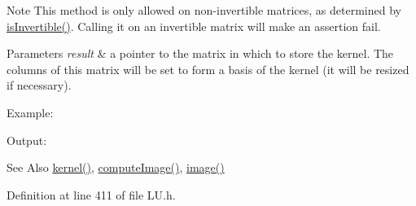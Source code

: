 \begin{DoxyNote}{Note}
This method is only allowed on non-\/invertible matrices, as determined by \hyperlink{class_l_u_a7b4fe58c504fb3c28d29f198a10bf5e0}{is\-Invertible()}. Calling it on an invertible matrix will make an assertion fail.
\end{DoxyNote}

\begin{DoxyParams}{Parameters}
{\em result} & a pointer to the matrix in which to store the kernel. The columns of this matrix will be set to form a basis of the kernel (it will be resized if necessary).\\
\hline
\end{DoxyParams}
Example\-:
\begin{DoxyCodeInclude}
\end{DoxyCodeInclude}
 Output\-:
\begin{DoxyVerbInclude}
\end{DoxyVerbInclude}


\begin{DoxySeeAlso}{See Also}
\hyperlink{class_l_u_af6f47fa3872cd3e7931ef553e862202d}{kernel()}, \hyperlink{class_l_u_a31aedc3a457bdbb5f5d07c8bf07464da}{compute\-Image()}, \hyperlink{class_l_u_a2c7e6a983dc0e0aad12040a653e05529}{image()} 
\end{DoxySeeAlso}


Definition at line 411 of file L\-U.\-h.

